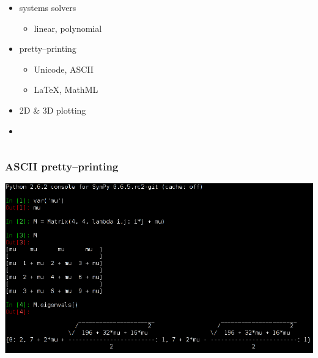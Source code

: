 \documentclass[handout]{beamer}
\begin{document}
\begin{frame}[fragile]
\begin{columns}
\begin{column}[r]{0.5\textwidth}
\begin{itemize}
                \item systems solvers
                    \begin{itemize}
                        \item linear, polynomial
                    \end{itemize}
                \item pretty--printing
                    \begin{itemize}
                        \item Unicode, ASCII
                        \item LaTeX, MathML
                    \end{itemize}
                \item 2D \& 3D plotting
                \item \structure{\ldots}
            \end{itemize}
        \end{column}
    \end{columns}
\end{frame}

\begin{frame}[fragile]
    \frametitle{ASCII pretty--printing}

    \begin{center}
        \includegraphics[scale=0.65]{images/sympy-ascii.png}
    \end{center}
\end{frame}
\end{document}
